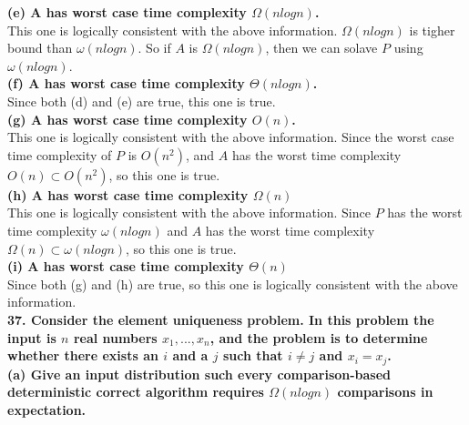 \documentclass{article}
\begin{document}
\textbf{(e) A has worst case time complexity $\Omega(nlogn)$.} \\ \newline
This one is logically consistent with the above information. $\Omega(nlogn)$ is tigher bound than $\omega(nlogn)$. So if $A$ is $\Omega(nlogn)$, then we can solave $P$ using $\omega(nlogn)$.\\ \newline
\textbf{(f) A has worst case time complexity $\Theta(nlogn)$.} \\ \newline
Since both (d) and (e) are true, this one is true.\\ \newline
\textbf{(g) A has worst case time complexity $O(n)$.} \\\newline
This one is logically consistent with the above information. Since the worst case time complexity of $P$ is $O(n^2)$, and $A$ has the worst time complexity $O(n) \subset O(n^2)$, so this one is true.\\ \newline
\textbf{(h) A has worst case time complexity $\Omega(n)$} \\\newline This one is logically consistent with the above information. Since $P$ has the worst time complexity $\omega(nlogn)$ and $A$ has the worst time complexity $\Omega(n) \subset \omega(nlogn)$, so this one is true.\\ \newline
\textbf{(i) A has worst case time complexity $\Theta(n)$} \\ \newline Since both (g) and (h) are true, so this one is logically consistent with the above information.\\ \newline
\textbf{37. Consider the element uniqueness problem. In this problem the input is $n$ real numbers $x_1,..., x_n$, and the problem is to determine whether there exists an $i$ and a $j$ such that $i\neq j$ and $x_i = x_j$.}\\\newline
\textbf{(a) Give an input distribution such every comparison-based deterministic correct algorithm requires $\Omega(nlogn)$ comparisons in expectation.} \\ \newline
\end{document}
